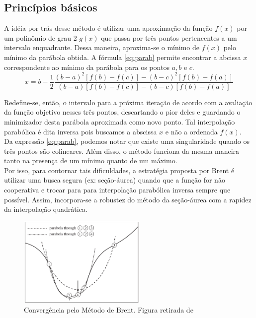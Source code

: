 \documentclass[a4paper,12pt,utf8x,notitlepage]{article}
\begin{document}
\vspace{0.5cm}

\subsection{Princípios básicos}

A idéia por trás desse método é utilizar uma aproximação da função $f(x)$ por um polinômio de grau 2 $g(x)$ que passa por três pontos pertencentes a um intervalo enquadrante. Dessa maneira, aproxima-se o mínimo de $f(x)$ pelo mínimo da parábola obtida. A fórmula \ref{eq:parab} permite encontrar a abcissa $x$ correspondente ao mínimo da parábola para os pontos $a,b$ e $c$.\\

\begin{equation}
  x = b - \frac{1}{2}\frac{(b-a)^2[f(b)-f(c)] - (b-c)^2[f(b)-f(a)]}{(b-a)[f(b)-f(c)] - (b-c)[f(b)-f(a)]} 
  \label{eq:parab}
\end{equation}

Redefine-se, então, o intervalo para a próxima iteração de acordo com a avaliação da função objetivo nesses três pontos, descartando o pior deles e guardando o minimizador desta parábola aproximada como novo ponto. Tal interpolação parabólica é dita inversa pois buscamos a abscissa $x$ e não a ordenada $f(x)$. \\

Da expressão \ref{eq:parab}, podemos notar que existe uma singularidade quando os três pontos são colineares. Além disso, o método funciona da mesma maneira tanto na presença de um mínimo quanto de um máximo. \\

Por isso, para contornar tais dificuldades, a estratégia proposta por Brent é utilizar uma busca segura (ex: seção-áurea) quando que a função for não cooperativa e trocar para para interpolação parabólica inversa sempre que possível. Assim, incorpora-se a robustez do método da seção-áurea com a rapidez da interpolação quadrática.\\

\begin{figure}[!h]
\centering
    \includegraphics[width=0.55\textwidth]{parabola.pdf}
    \caption{Convergência pelo Método de Brent. Figura retirada de \cite{Brent} }
\label{fig:parabolas}
\end{figure}
\end{document}
